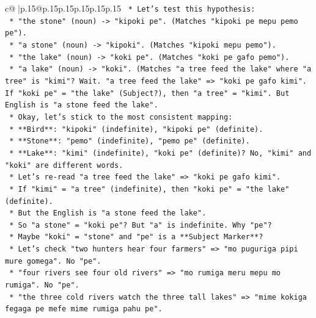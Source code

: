 \documentclass{article}
\begin{document}
{\begin{supertabular}{c@{$\;$}|p{.15\linewidth}@{}p{.15\linewidth}p{.15\linewidth}p{.15\linewidth}p{.15\linewidth}p{.15\linewidth}}
{{{\texttt{                    *   Let's test this hypothesis:} \\
\texttt{                        *   "the stone" (noun) {-}> "kipoki pe". (Matches "kipoki pe mepu pemo pe").} \\
\texttt{                        *   "a stone" (noun) {-}> "kipoki". (Matches "kipoki mepu pemo").} \\
\texttt{                        *   "the lake" (noun) {-}> "koki pe". (Matches "koki pe gafo pemo").} \\
\texttt{                        *   "a lake" (noun) {-}> "koki". (Matches "a tree feed the lake" where "a tree" is "kimi"? Wait. "a tree feed the lake" => "koki pe gafo kimi". If "koki pe" = "the lake" (Subject?), then "a tree" = "kimi". But English is "a stone feed the lake".} \\
\texttt{                        *   Okay, let's stick to the most consistent mapping:} \\
\texttt{                            *   **Bird**: "kipoki" (indefinite), "kipoki pe" (definite).} \\
\texttt{                            *   **Stone**: "pemo" (indefinite), "pemo pe" (definite).} \\
\texttt{                            *   **Lake**: "kimi" (indefinite), "koki pe" (definite)? No, "kimi" and "koki" are different words.} \\
\texttt{                            *   Let's re{-}read "a tree feed the lake" => "koki pe gafo kimi".} \\
\texttt{                                *   If "kimi" = "a tree" (indefinite), then "koki pe" = "the lake" (definite).} \\
\texttt{                                *   But the English is "a stone feed the lake".} \\
\texttt{                                *   So "a stone" = "koki pe"? But "a" is indefinite. Why "pe"?} \\
\texttt{                                *   Maybe "koki" = "stone" and "pe" is a **Subject Marker**?} \\
\texttt{                                *   Let's check "two hunters hear four farmers" => "mo puguriga pipi mure gomega". No "pe".} \\
\texttt{                                *   "four rivers see four old rivers" => "mo rumiga meru mepu mo rumiga". No "pe".} \\
\texttt{                                *   "the three cold rivers watch the three tall lakes" => "mime kokiga fegaga pe mefe mime rumiga pahu pe".} \\
}}}
\end{supertabular}}
\end{document}
